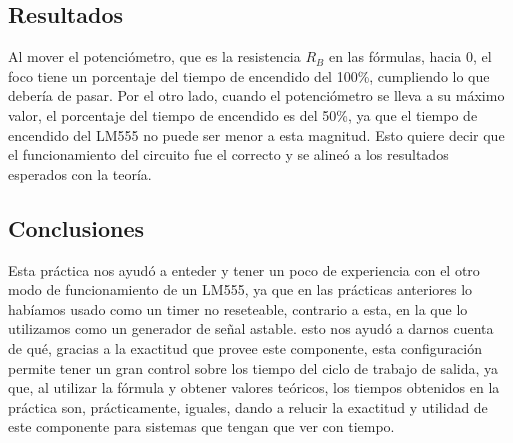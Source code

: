 \subsection{Resultados}

Al mover el potenciómetro, que es la resistencia $R_B$ en las fórmulas, hacia 0, el foco tiene un porcentaje del tiempo de encendido del 100\%, cumpliendo lo que debería de pasar. Por el otro lado, cuando el potenciómetro se lleva a su máximo valor, el porcentaje del tiempo de encendido es del 50\%, ya que el tiempo de encendido del LM555 no puede ser menor a esta magnitud. Esto quiere decir que el funcionamiento del circuito fue el correcto y se alineó a los resultados esperados con la teoría.

\subsection{Conclusiones}

Esta práctica nos ayudó a enteder y tener un poco de experiencia con el otro modo de funcionamiento de un LM555, ya que en las prácticas anteriores lo habíamos usado como un timer no reseteable, contrario a esta, en la que lo utilizamos como un generador de señal astable. esto nos ayudó a darnos cuenta de qué, gracias a la exactitud que provee este componente, esta configuración permite tener un gran control sobre los tiempo del ciclo de trabajo de salida, ya que, al utilizar la fórmula y obtener valores teóricos, los tiempos obtenidos en la práctica son, prácticamente, iguales, dando a relucir la exactitud y utilidad de este componente para sistemas que tengan que ver con tiempo.
